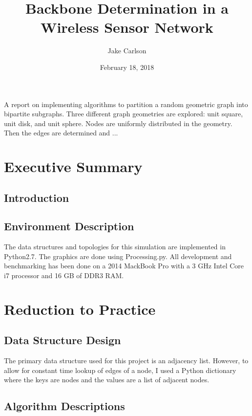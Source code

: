 \documentclass{article}
\begin{document}
\title{Backbone Determination in a Wireless Sensor Network}
\author{Jake Carlson}
\date{February 18, 2018}
\maketitle

\abstract
A report on implementing algorithms to partition a random geometric graph into bipartite subgraphs. Three different graph geometries are explored: unit square, unit disk, and unit sphere. Nodes are uniformly distributed in the geometry. Then the edges are determined and ...
\newpage

\tableofcontents
\newpage

\section{Executive Summary}

    \subsection{Introduction}

    \subsection{Environment Description}
    The data structures and topologies for this simulation are implemented in Python2.7. The graphics are done using Processing.py. All development and benchmarking has been done on a 2014 MackBook Pro with a 3 GHz Intel Core i7 processor and 16 GB of DDR3 RAM.

\section{Reduction to Practice}

    \subsection{Data Structure Design}
    The primary data structure used for this project is an adjacency list. However, to allow for constant time lookup of edges of a node, I used a Python dictionary where the keys are nodes and the values are a list of adjacent nodes.

    \subsection{Algorithm Descriptions}
\end{document}
